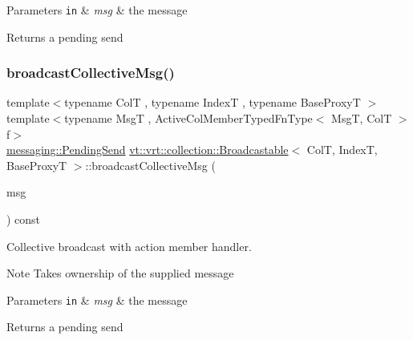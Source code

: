 \begin{DoxyParams}[1]{Parameters}
\mbox{\tt in}  & {\em msg} & the message\\
\hline
\end{DoxyParams}
\begin{DoxyReturn}{Returns}
a pending send 
\end{DoxyReturn}
\mbox{\label{structvt_1_1vrt_1_1collection_1_1_broadcastable_a70ec0f06ef5566c713a4d960a8faa39b}} 
\subsubsection{\texorpdfstring{broadcast\+Collective\+Msg()}{broadcastCollectiveMsg()}\hspace{0.1cm}{\footnotesize\ttfamily [2/2]}}
{\footnotesize\ttfamily template$<$typename ColT , typename IndexT , typename Base\+ProxyT $>$ \\
template$<$typename MsgT , Active\+Col\+Member\+Typed\+Fn\+Type$<$ Msg\+T, Col\+T $>$ f$>$ \\
\hyperlink{structvt_1_1messaging_1_1_pending_send}{messaging\+::\+Pending\+Send} \hyperlink{structvt_1_1vrt_1_1collection_1_1_broadcastable}{vt\+::vrt\+::collection\+::\+Broadcastable}$<$ ColT, IndexT, Base\+ProxyT $>$\+::broadcast\+Collective\+Msg (\begin{DoxyParamCaption}\item[{\hyperlink{structvt_1_1messaging_1_1_msg_ptr_thief}{messaging\+::\+Msg\+Ptr\+Thief}$<$ MsgT $>$}]{msg }\end{DoxyParamCaption}) const}



Collective broadcast with action member handler. 

\begin{DoxyNote}{Note}
Takes ownership of the supplied message
\end{DoxyNote}

\begin{DoxyParams}[1]{Parameters}
\mbox{\tt in}  & {\em msg} & the message\\
\hline
\end{DoxyParams}
\begin{DoxyReturn}{Returns}
a pending send 
\end{DoxyReturn}
\mbox{\label{structvt_1_1vrt_1_1collection_1_1_broadcastable_a520d37e5da6ce89657f6d33162a23003}} 
